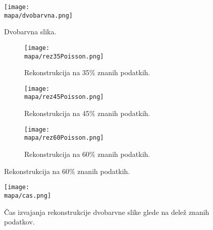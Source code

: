 \renewcommand{\mapa}{Poglavja/Slike/dvobarvna}

\begin{figure}[!ht]
    \centering
    \texttt{[image: \\mapa/dvobarvna.png]}
    \caption{Dvobarvna slika.}
\end{figure}

\begin{figure}[!ht]
    \begin{subfigure}{0.32\linewidth}
        \texttt{[image: \\mapa/rez35Poisson.png]}
        \caption{Rekonstrukcija na 35\% znanih podatkih.}
    \end{subfigure}
    \hfill
    \begin{subfigure}{0.32\linewidth}
        \texttt{[image: \\mapa/rez45Poisson.png]}
        \caption{Rekonstrukcija na 45\% znanih podatkih.}
    \end{subfigure}
    \hfill
    \begin{subfigure}{0.32\linewidth}
        \texttt{[image: \\mapa/rez60Poisson.png]}
        \caption{Rekonstrukcija na 60\% znanih podatkih.}
    \end{subfigure}
\end{figure}

\begin{figure}[!ht]
    \centering
    \texttt{[image: \\mapa/cas.png]}
    \caption{Čas izvajanja rekonstrukcije dvobarvne slike glede na delež znanih podatkov.}
\end{figure}